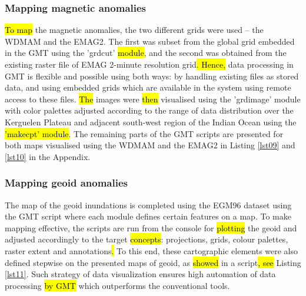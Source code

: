 \documentclass[geomatics,article,submit,pdftex,moreauthors]{Definitions/mdpi}
\begin{document}
\subsubsection{Mapping magnetic anomalies}

\hl{To map} the magnetic anomalies, the two different grids were used -- the WDMAM and the EMAG2. The first was subset from the global grid embedded in the GMT using the 'grdcut' \hl{module}, and the second was obtained from the existing raster file of EMAG 2-minute resolution grid\hl{. Hence, } data processing in GMT is flexible and possible using both ways: by handling existing files as stored data, and using embedded grids which are available in the\hl{ }system using remote access to these files. \hl{The} images were \hl{then }visualised using the 'grdimage' module with color palettes adjusted according to the range of data distribution over the Kerguelen Plateau and adjacent south-west region of the Indian Ocean using the \hl{'makecpt' module}. The remaining parts of the GMT scripts are presented for both maps visualised using the WDMAM and the EMAG2\hl{ }in Listing \ref{lst09} and \ref{lst10} in the Appendix.

\subsubsection{Mapping geoid anomalies}

The map of the geoid inundations is completed using the EGM96 dataset using the\hl{ }GMT script where each module defines certain features on a map. To make mapping\hl{ }effective, the scripts are run from the console for \hl{plotting} the geoid and adjusted accordingly to the target \hl{concepts}: projections, grids, colour palettes, raster extent and annotations\hl{. }To this end, these cartographic elements were also defined stepwise on the presented maps of geoid, as \hl{showed} in a script\hl{, see} Listing \ref{lst11}. Such strategy of data visualization\hl{ }ensures high automation of data processing \hl{by GMT }which outperforms the conventional\hl{ }tools.
\end{document}
